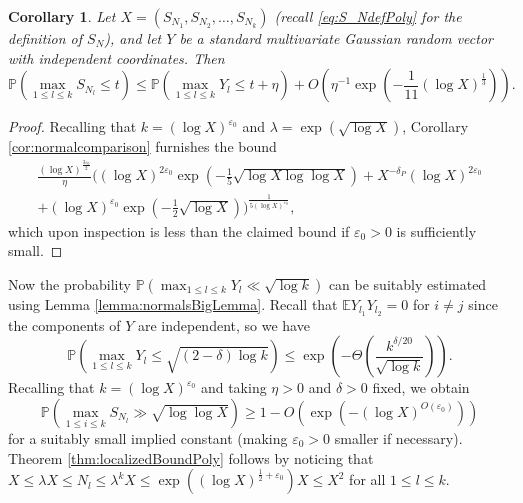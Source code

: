 \documentclass[11pt]{tran-l}
\newtheorem{cor}[theorem]{Corollary}
\theoremstyle{definition}
\theoremstyle{remark}
\numberwithin{equation}{section}
\begin{document}
\begin{cor}\label{cor:MCLTpoly}
    Let $X=(S_{N_1}, S_{N_2}, \ldots, S_{N_k})$ (recall \eqref{eq:S_NdefPoly} for the definition of $S_N$), and let $Y$ be a standard multivariate Gaussian random vector with independent coordinates. Then 
\begin{equation*}
\mathbb P\left(\max_{1\leq l\leq k} S_{N_l} \leq t\right)\leq \mathbb P\left(\max_{1\leq l\leq k} Y_l\leq t+\eta\right) + O\left( \eta^{-1}\exp\left(-\frac{1}{11}(\log X)^{\frac{1}{3}} \right)\right).
 \end{equation*}
\end{cor}
\begin{proof}
    Recalling that $k=(\log X)^{\varepsilon_0}$ and $\lambda = \exp(\sqrt{\log X})$, Corollary \ref{cor:normalcomparison} furnishes the bound 
    \begin{multline*}
        \frac{(\log X)^{\frac{3\varepsilon_0}{2}}} {\eta}\Big((\log X)^{2\varepsilon_0}\exp\left(-\frac{1}{5}\sqrt{\log X\log\log X} \right)  + X^{-\delta_P}(\log X)^{2\varepsilon_0} \\ + (\log X)^{\varepsilon_0}\exp\left(-\frac{1}{2}\sqrt{\log X}\right)  \Big)^{\frac1{5(\log X)^{\varepsilon_0}}},
    \end{multline*}
    which upon inspection is less than the claimed bound if $\varepsilon_0>0$ is sufficiently small. 
\end{proof}

Now the probability $\mathbb P\left(\max_{1\leq l\leq k} Y_l\ll\sqrt{\log k}\right)$ can be suitably estimated using Lemma \ref{lemma:normalsBigLemma}. Recall that $\mathbb E Y_{l_1}Y_{l_2}= 0$ for $i\neq j$ since the components of $Y$ are independent, so we have 
\begin{equation*}
    \mathbb P\left(\max_{1\leq l\leq k} Y_l\leq\sqrt{(2-\delta)\log k}\right)\leq \exp\left(-\Theta\left(\frac{k^{\delta/20}}{\sqrt{\log k}}\right)\right).
\end{equation*}
Recalling that $k=(\log X)^{\varepsilon_0}$ and taking $\eta>0$ and $\delta>0$ fixed, we obtain 
\begin{equation*}
    \mathbb P\left(\max_{1\leq i\leq k} S_{N_l} \gg \sqrt{\log\log X}\right)  \geq 1 - O\left(\exp\left(-(\log X)^{O(\varepsilon_0)}\right)\right)
\end{equation*}
for a suitably small implied constant (making $\varepsilon_0>0$ smaller if necessary). Theorem \ref{thm:localizedBoundPoly} follows by noticing that $X\leq \lambda X\leq N_l\leq \lambda^kX\leq \exp\left((\log X)^{\frac{1}{2}+\varepsilon_0}\right)X\leq X^2$ for all $1\leq l\leq k$. 
\end{document}
